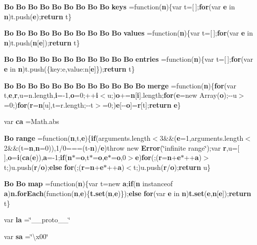 \begin{DoxyCompactItemize}
\item 
{\bf Bo} {\bf Bo} {\bf Bo} {\bf Bo} {\bf Bo} {\bf Bo} {\bf Bo} {\bf Bo} {\bf Bo} {\bf keys} =function({\bf n})\{var t=[$\,$];{\bf for}(var {\bf e} in {\bf n})t.\+push({\bf e});{\bf return} t\}
\item 
{\bf Bo} {\bf Bo} {\bf Bo} {\bf Bo} {\bf Bo} {\bf Bo} {\bf Bo} {\bf Bo} {\bf Bo} {\bf Bo} {\bf values} =function({\bf n})\{var t=[$\,$];{\bf for}(var {\bf e} in {\bf n})t.\+push({\bf n}[{\bf e}]);{\bf return} t\}
\item 
{\bf Bo} {\bf Bo} {\bf Bo} {\bf Bo} {\bf Bo} {\bf Bo} {\bf Bo} {\bf Bo} {\bf Bo} {\bf Bo} {\bf Bo} {\bf entries} =function({\bf n})\{var t=[$\,$];{\bf for}(var {\bf e} in {\bf n})t.\+push(\{key\+:e,value\+:n[{\bf e}]\});{\bf return} t\}
\item 
{\bf Bo} {\bf Bo} {\bf Bo} {\bf Bo} {\bf Bo} {\bf Bo} {\bf Bo} {\bf Bo} {\bf Bo} {\bf Bo} {\bf Bo} {\bf Bo} {\bf merge} =function({\bf n})\{{\bf for}(var t,{\bf e},{\bf r},u=n.\+length,{\bf i}=-\/1,{\bf o}=0;++{\bf i}$<$u;){\bf o}+={\bf n}[{\bf i}].length;{\bf for}({\bf e}=new Array({\bf o});-\/-\/u$>$=0;){\bf for}({\bf r}={\bf n}[u],t=r.\+length;-\/-\/t$>$=0;){\bf e}[-\/-\/{\bf o}]={\bf r}[t];{\bf return} {\bf e}\}
\item 
var {\bf ca} =Math.\+abs
\item 
{\bf Bo} {\bf range} =function({\bf n},t,{\bf e})\{{\bf if}(arguments.\+length$<$3\&\&({\bf e}=1,arguments.\+length$<$2\&\&(t={\bf n},{\bf n}=0)),1/0===(t-\/{\bf n})/{\bf e})throw new {\bf Error}(\char`\"{}infinite range\char`\"{});var {\bf r},u=[$\,$],{\bf o}={\bf i}({\bf ca}({\bf e})),{\bf a}=-\/1;{\bf if}({\bf n}$\ast$={\bf o},t$\ast$={\bf o},{\bf e}$\ast$={\bf o},0$>${\bf e}){\bf for}(;({\bf r}={\bf n}+{\bf e}$\ast$++{\bf a})$>$t;)u.\+push({\bf r}/{\bf o});{\bf else} {\bf for}(;({\bf r}={\bf n}+{\bf e}$\ast$++{\bf a})$<$t;)u.\+push({\bf r}/{\bf o});{\bf return} u\}
\item 
{\bf Bo} {\bf Bo} {\bf map} =function({\bf n})\{var t=new {\bf a};{\bf if}({\bf n} instanceof {\bf a}){\bf n.\+for\+Each}(function({\bf n},{\bf e})\{{\bf t.\+set}({\bf n},{\bf e})\});{\bf else} {\bf for}(var {\bf e} in {\bf n}){\bf t.\+set}({\bf e},{\bf n}[{\bf e}]);{\bf return} t\}
\item 
var {\bf la} =\char`\"{}\+\_\+\+\_\+proto\+\_\+\+\_\+\char`\"{}
\item 
var {\bf sa} =\char`\"{}\textbackslash{}x00\char`\"{}
\item 

\end{DoxyCompactItemize}
